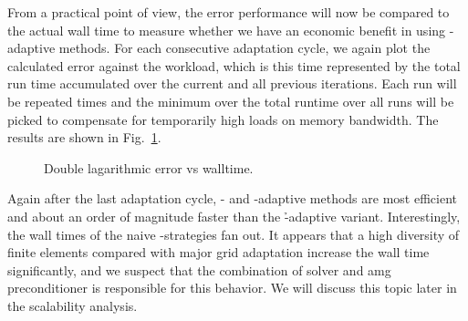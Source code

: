 



From a practical point of view, the error performance will now be compared to the actual wall time to measure whether we have an economic benefit in using \hp-adaptive methods. For each consecutive adaptation cycle, we again plot the calculated error against the workload, which is this time represented by the total run time accumulated over the current and all previous iterations. Each run will be repeated  times and the minimum over the total runtime over all runs will be picked to compensate for temporarily high loads on memory bandwidth. The results are shown in Fig.~\ref{fig:errorwalltime}.

\begin{figure}
\centering

%  
\caption{Double lagarithmic error vs walltime.}
\label{fig:errorwalltime}
\end{figure}


Again after the last adaptation cycle, \p- and \hp-adaptive methods are most efficient and about an order of magnitude faster than the \h-adaptive variant. Interestingly, the wall times of the naive \hp-strategies fan out. It appears that a high diversity of finite elements compared with major grid adaptation increase the wall time significantly, and we suspect that the combination of solver and \gls{amg} preconditioner is responsible for this behavior. We will discuss this topic later in the scalability analysis.

